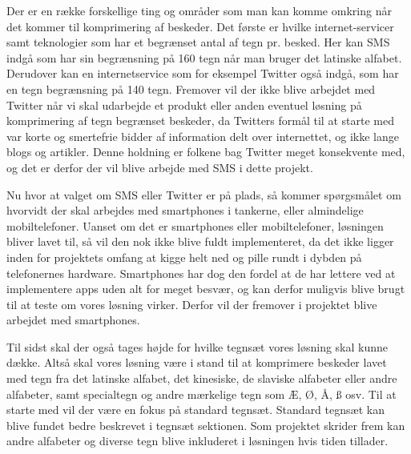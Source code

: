 Der er en række forskellige ting og områder som man kan komme omkring når det kommer til komprimering af beskeder. Det første er hvilke internet-servicer samt teknologier som har et begrænset antal af tegn pr. besked. Her kan SMS indgå som har sin begrænsning på 160 tegn når man bruger det latinske alfabet\cite{Pro_1}. Derudover kan en internetservice som for eksempel Twitter også indgå, som har en tegn begrænsning på 140 tegn\cite{pro_af1}. Fremover vil der ikke blive arbejdet med Twitter når vi skal udarbejde et produkt eller anden eventuel løsning på komprimering af tegn begrænset beskeder, da Twitters formål til at starte med var korte og smertefrie bidder af information delt over internettet, og ikke lange blogs og artikler. Denne holdning er folkene bag Twitter meget konsekvente med\cite{pro_af2}, og det er derfor der vil blive arbejde med SMS i dette projekt.

Nu hvor at valget om SMS eller Twitter er på plads, så kommer spørgsmålet om hvorvidt der skal arbejdes med smartphones i tankerne, eller almindelige mobiltelefoner. Uanset om det er smartphones eller mobiltelefoner, løsningen bliver lavet til, så vil den nok ikke blive fuldt implementeret, da det ikke ligger inden for projektets omfang at kigge helt ned og pille rundt i dybden på telefonernes hardware. Smartphones har dog den fordel at de har lettere ved at implementere apps uden alt for meget besvær, og kan derfor muligvis blive brugt til at teste om vores løsning virker. Derfor vil der fremover i projektet blive arbejdet med smartphones.

Til sidst skal der også tages højde for hvilke tegnsæt vores løsning skal kunne dække. Altså skal vores løsning være i stand til at komprimere beskeder lavet med tegn fra det latinske alfabet, det kinesiske, de slaviske alfabeter eller andre alfabeter, samt specialtegn og andre mærkelige tegn som Æ, Ø, Å, ß osv. Til at starte med vil der være en fokus på standard tegnsæt. Standard tegnsæt kan blive fundet bedre beskrevet i tegnsæt sektionen. Som projektet skrider frem kan andre alfabeter og diverse tegn blive inkluderet i løsningen hvis tiden tillader.